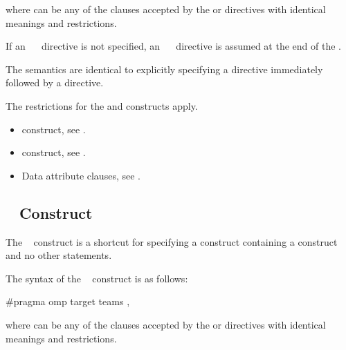 where  can be any of the clauses accepted by the  or 
 directives with identical meanings and restrictions.

If an ~~ directive is not specified, an 
~~ directive is assumed at the end of 
the .
\fortranspecificend

\descr
The semantics are identical to explicitly specifying a  directive 
immediately followed by a  directive. 

\restrictions

The restrictions for the  and  constructs apply.

\crossreferences
\begin{itemize}
\item {} construct, see 
.

\item {} construct, see 
.

\item Data attribute clauses, see 
.
\end{itemize}









\subsection{~ Construct}
\label{subsec:target teams Construct}
\summary
The ~ construct is a shortcut for specifying a  construct 
containing a  construct and no other statements.

\syntax
\ccppspecificstart
The syntax of the ~ construct is as follows:

\begin{boxedcode}
\#pragma omp target teams \plc{[clause[ [},\plc{] clause] ... ]}
\end{boxedcode}

where  can be any of the clauses accepted by the  or  directives 
with identical meanings and restrictions.
\ccppspecificend

